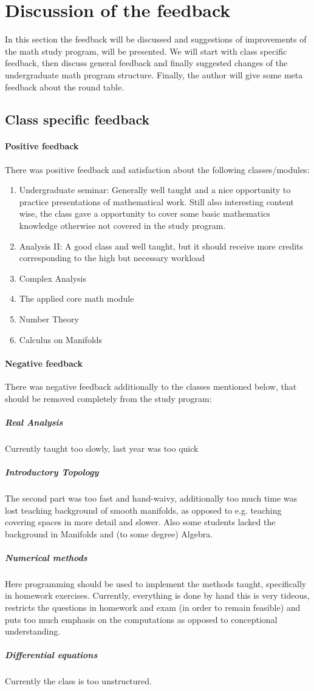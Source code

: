 \section{Discussion of the feedback}
\label{sec-1}
\label{sec:dis}
In this section the feedback will be discussed and suggestions of improvements of the math study program, will be presented. 
We will start with class specific feedback, then discuss general feedback and finally suggested changes of the undergraduate math program structure. 
Finally, the author will give some meta feedback about the round table.

\subsection{Class specific feedback}
\label{sec-1-1}
\label{subsec:spec}
\paragraph{Positive feedback} There was positive feedback and satisfaction about the following classes/modules:
\begin{enumerate}
\item Undergraduate seminar: Generally well taught and a nice opportunity to practice presentations of mathematical work. Still also interesting content wise, the class gave a opportunity to cover some basic mathematics knowledge otherwise not covered in the study program.
\item Analysis II: A good class and well taught, but it should receive more credits corresponding to the high but necessary workload
\item Complex Analysis
\item The applied core math module
\item Number Theory
\item Calculus on Manifolds
\end{enumerate}

\paragraph{Negative feedback} There was negative feedback additionally to the classes mentioned below, that should be removed completely from the study program:
\subparagraph{Real Analysis} Currently taught too slowly, last year was too quick
\subparagraph{Introductory Topology} The second part was too fast and hand-waivy, additionally too much time was lost teaching background of smooth manifolds, as opposed to e.g. teaching covering spaces in more detail and slower. 
Also some students lacked the background in Manifolds and (to some degree) Algebra.
\subparagraph{Numerical methods} Here programming should be used to implement the methods taught, specifically in homework exercises. 
Currently, everything is done by hand this is very tideous, restricts the questions in homework and exam (in order to remain feasible) and puts too much emphasis on
the computations as opposed to conceptional understanding. 
\subparagraph{Differential equations} Currently the class is too unstructured.



